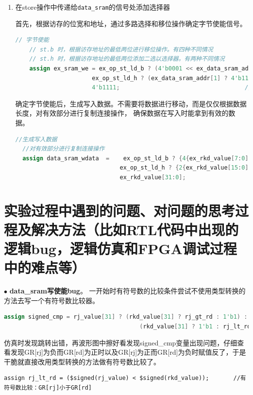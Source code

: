 \documentclass[11pt]{article}
\begin{document}
\begin{enumerate}
  \item 在store操作中传递给\verb|data_sram|的信号处添加选择器
  
  首先，根据访存的位宽和地址，通过多路选择和移位操作确定字节使能信号。
  \begin{lstlisting}[language=verilog]
    // 字节使能
    // st.b 时，根据访存地址的最低两位进行移位操作。有四种不同情况
    // st.h 时，根据访存地址的最低两位添加二选以选择器。有两种不同情况
    assign ex_sram_we = ex_op_st_ld_b ? (4'b0001 << ex_data_sram_addr[1:0]) :           // st.b
                      ex_op_st_ld_h ? (ex_data_sram_addr[1] ? 4'b1100 : 4'b0011) :    // st.h
                      4'b1111;                                    // st.w
  \end{lstlisting}
  确定字节使能后，生成写入数据。不需要将数据进行移动，而是仅仅根据数据长度，对有效部分进行复制连接操作，
  确保数据在写入时能拿到有效的数据。
\begin{lstlisting}[language=verilog]
  //生成写入数据
  //对有效部分进行复制连接操作
  assign data_sram_wdata  =    ex_op_st_ld_b ? {4{ex_rkd_value[7:0]}}:
                              ex_op_st_ld_h ? {2{ex_rkd_value[15:0]}}:
                              ex_rkd_value[31:0];
\end{lstlisting}
\end{enumerate}




\vspace{1ex}

\section{实验过程中遇到的问题、对问题的思考过程及解决方法（比如RTL代码中出现的逻辑bug，逻辑仿真和FPGA调试过程中的难点等）}

\noindent
$\bullet$
\textbf{data_sram写使能bug}。
一开始时有符号数的比较条件尝试不使用类型转换的方法去写一个有符号数比较器。
\begin{lstlisting}[language=verilog]
 assign signed_cmp = rj_value[31] ? (rkd_value[31] ? rj_gt_rd : 1'b1) :         
                                       (rkd_value[31] ? 1'b1 : rj_lt_rd);       //有符号数比较：GR[rj]小于GR[rd]
\end{lstlisting}

仿真时发现跳转出错，再波形图中擦好看发现signed\_cmp变量出现问题，仔细查看发现GR[rj]为负而GR[rd]为正时以及GR[rj]为正而GR[rd]为负时赋值反了，于是干脆就直接改用类型转换的方法做有符号数比较了。
\begin{lstlisting}
assign rj_lt_rd = ($signed(rj_value) < $signed(rkd_value));       //有符号数比较：GR[rj]小于GR[rd]
\end{lstlisting}
\vspace{1ex}
\end{document}
